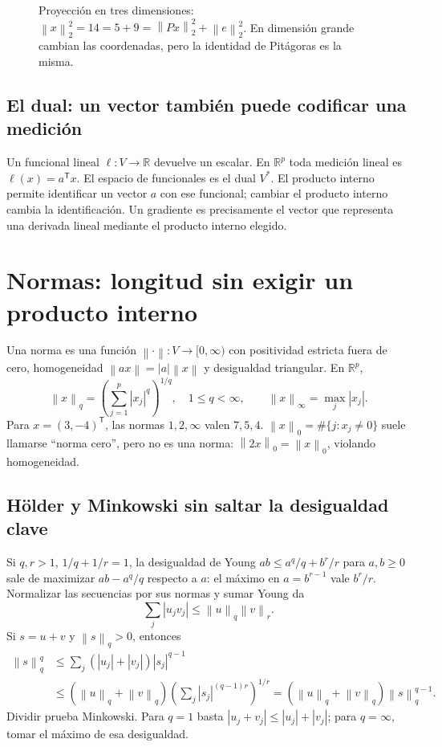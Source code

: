 \documentclass[11pt,a4paper]{article}
\newcommand{\R}{\mathbb R}
\newcommand{\T}{^{\mathsf T}}
\newcommand{\norm}[1]{\left\lVert #1\right\rVert}
\theoremstyle{definition}
\begin{document}
\begin{figure}[H]\centering
{}
\caption{Proyección en tres dimensiones: $\norm x_2^2=14=5+9=\norm{Px}_2^2+\norm e_2^2$. En dimensión grande cambian las coordenadas, pero la identidad de Pitágoras es la misma.}
\end{figure}

\subsection{El dual: un vector también puede codificar una medición}
Un funcional lineal $\ell:V\to\R$ devuelve un escalar. En $\R^p$ toda medición lineal es $\ell(x)=a\T x$. El espacio de funcionales es el dual $V^*$. El producto interno permite identificar un vector $a$ con ese funcional; cambiar el producto interno cambia la identificación. Un gradiente es precisamente el vector que representa una derivada lineal mediante el producto interno elegido.

\section{Normas: longitud sin exigir un producto interno}
Una norma es una función $\norm\cdot:V\to[0,\infty)$ con positividad estricta fuera de cero, homogeneidad $\norm{ax}=|a|\norm x$ y desigualdad triangular. En $\R^p$,
\[
\norm x_q=\left(\sum_{j=1}^p|x_j|^q\right)^{1/q},\quad 1\le q<\infty,
\qquad\norm x_\infty=\max_j|x_j|.
\]
Para $x=(3,-4)\T$, las normas $1,2,\infty$ valen $7,5,4$. $\norm x_0=\#\{j:x_j\ne0\}$ suele llamarse ``norma cero'', pero no es una norma: $\norm{2x}_0=\norm x_0$, violando homogeneidad.
\subsection{Hölder y Minkowski sin saltar la desigualdad clave}
Si $q,r>1$, $1/q+1/r=1$, la desigualdad de Young $ab\le a^q/q+b^r/r$ para $a,b\ge0$ sale de maximizar $ab-a^q/q$ respecto a $a$: el máximo en $a=b^{r-1}$ vale $b^r/r$. Normalizar las secuencias por sus normas y sumar Young da
\[
\sum_j|u_jv_j|\le\norm u_q\norm v_r.
\]
Si $s=u+v$ y $\norm s_q>0$, entonces
\begin{align*}
\norm s_q^q&\le\sum_j(|u_j|+|v_j|)|s_j|^{q-1}\\
&\le(\norm u_q+\norm v_q)
\left(\sum_j|s_j|^{(q-1)r}\right)^{1/r}
=(\norm u_q+\norm v_q)\norm s_q^{q-1}.
\end{align*}
Dividir prueba Minkowski. Para $q=1$ basta $|u_j+v_j|\le|u_j|+|v_j|$; para $q=\infty$, tomar el máximo de esa desigualdad.
\end{document}
